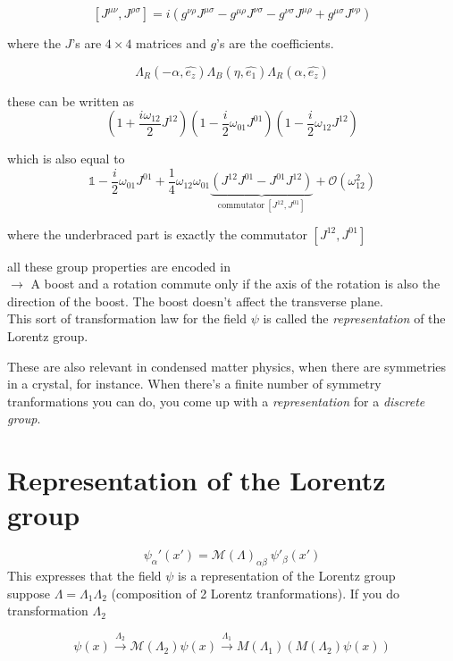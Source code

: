 \documentclass[11pt]{article}
\begin{document}
 
 \[ [ J^{\mu\nu}, J^{\rho\sigma}] = i(g^{\nu\rho}J^{\mu\sigma} - g^{\mu\rho} J^{\nu\sigma} - g^{\nu\sigma} J^{\mu\rho} + g^{\mu\sigma} J^{\nu\rho})\]
 
 where the $J$'s are $4\times 4$ matrices and $g$'s are the coefficients.
 
 \[ \Lambda_R(-\alpha, \hat{e_z}) \Lambda_B(\eta, \hat{e_1}) \Lambda_R(\alpha, \hat{e_z}) \]
 
 these can be written as \[ \left( 1 + \frac{i\omega_{12}}{2}J^{12} \right) \left( 1 - \frac{i}{2} \omega_{01}J^{01}\right)  \left(1 - \frac{i}{2} \omega_{12} J^{12}\right) \]
 
 which is also equal to \[ \mathbb{1} - \frac{i}{2}\omega_{01}J^{01} + \frac{1}{4} \omega_{12}\omega_{01} \underbrace{(J^{12} J^{01} - J^{01}J^{12})}_{\text{commutator}\ [J^{12}, J^{01}]} + \mathcal{O}(\omega_{12}^2)\]
 
 where the underbraced part is exactly the commutator $[J^{12}, J^{01}]$
 
 all these group properties are encoded in \\
 
 $\rightarrow$ A boost and a rotation commute only if the axis of the rotation is also the direction of the boost. The boost doesn't affect the transverse plane.\\

	This sort of transformation law for the field $\psi$ is called the \textit{representation} of the Lorentz group.
	
	These are also relevant in condensed matter physics, when there are symmetries in a crystal, for instance. When there's a finite number of symmetry tranformations you can do, you come up with a \textit{representation} for a \textit{discrete group}.
	
	\section*{Representation of the Lorentz group}
	
	\[ \psi_\alpha '(x') = \mathcal{M}(\Lambda)_{\alpha\beta}\ \psi'_\beta (x')\]
  This expresses that the field $\psi$ is a representation of the Lorentz group\\
  
	suppose $\Lambda = \Lambda_1 \Lambda_2$ (composition of 2 Lorentz tranformations). If you do transformation $\Lambda_2$
	
	\[ \psi(x) \xrightarrow{\Lambda_2} \mathcal{M} (\Lambda_2) \psi(x) \xrightarrow{\Lambda_1} M(\Lambda_1) (M(\Lambda_2)\psi(x))\]
	
\end{document}
